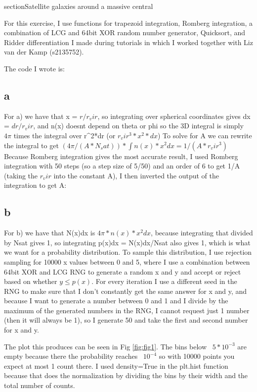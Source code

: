 section{Satellite galaxies around a massive central}

For this exercise, I use functions for trapezoid integration, Romberg integration, a combination of 
LCG and 64bit XOR random number generator, Quicksort, and Ridder differentiation I made during tutorials in 
which I worked together with Liz van der Kamp (s2135752).


The code I wrote is:


\subsection{a}

For a) we have that x = $r/r_vir$, so integrating over spherical coordinates gives dx = $dr/r_vir$, 
and n(x) doesnt depend on theta or phi so the 3D integral is simply $4\pi$ times the integral over 
r^2*dr (or $r_vir^3*x^2*dx$)
To solve for A we can rewrite the integral to get $(4\pi/(A*N_sat))*\int n(x)*x^2 dx = 1/(A*r_vir^3)$
Because Romberg integration gives the most accurate result, I used Romberg integration with 50 steps 
(so a step size of 5/50) and an order of 6 to get 1/A (taking the $r_vir$ into the constant A),
I then inverted the output of the integration to get A:


\subsection{b}

For b) we have that N(x)dx is $4\pi*n(x)*x^2 dx$, because integrating that divided by Nsat gives 1, 
so integrating p(x)dx = N(x)dx/Nsat also gives 1, which is what we want for a probability distribution.
To sample this distribution, I use rejection sampling for 10000 x values between 0 and 5,
where I use a combination between 64bit XOR and LCG RNG to generate a random x and y and accept or reject
based on whether $y \leq p(x)$. For every iteration I use a different seed in the RNG to make sure that I 
don't constantly get the same answer for x and y, and because I want to generate a number between 0 and 1 
and I divide by the maximum of the generated numbers in the RNG, I cannot request just 1 number 
(then it will always be 1), so I generate 50 and take the first and second number for x and y.

The plot this produces can be seen in Fig \ref{fig:fig1}. The bins below ~$5*10^{-3}$ are empty because there 
the probability reaches ~$10^{-4}$ so with 10000 points you expect at most 1 count there. 
I used density=True in the plt.hist function because that does the normalization by dividing the bins by 
their width and the total number of counts.

